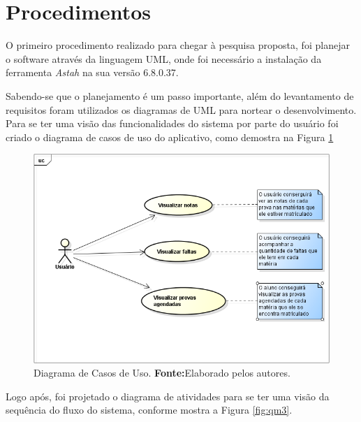 \section{Procedimentos}
	
	\par O primeiro procedimento realizado para chegar à pesquisa proposta, foi
planejar o software através da linguagem UML, onde foi necessário a instalação
da ferramenta \textit{Astah} na sua versão 6.8.0.37.

	\par Sabendo-se que o planejamento é um passo importante, além do levantamento
de requisitos foram utilizados os diagramas de UML para nortear o
desenvolvimento. Para se ter uma visão das funcionalidades do sistema por parte
do usuário foi criado o diagrama de casos de uso do aplicativo, como demostra
na Figura \ref{fig:qm2}
		
		\begin{figure}[h!]
			\centerline{\includegraphics[scale=0.5]{./imagens/2_q_metodologico/qm2.png}}
			\caption[Diagrama de Casos de Uso]{Diagrama de Casos de Uso.
			 \textbf{Fonte:}Elaborado pelos autores.}
			\label{fig:qm2}
		\end{figure}
		
	\par Logo após, foi projetado o diagrama de atividades para se ter uma visão
da sequência do fluxo do sistema, conforme mostra a Figura \ref{fig:qm3}.
		
